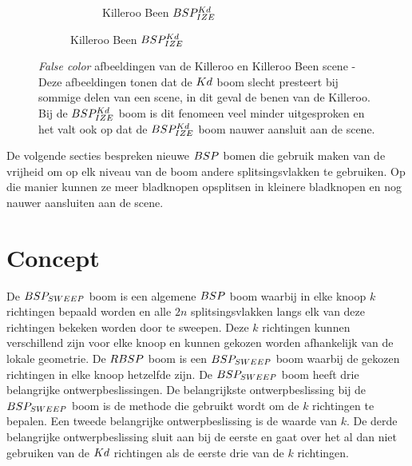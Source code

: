 \begin{figure}
\begin{subfigure}{0.5\textwidth}
\begin{subfigure}{\textwidth}
            \caption{Killeroo Been $BSP^{Kd}_{IZE}$}
            \label{fig:killeroo-been-bspize-heatmap}    
        \end{subfigure}
    \end{subfigure}
    \caption[\textit{False color} afbeeldingen van de Killeroo en Killeroo Been scene]{\textit{False color} afbeeldingen van de Killeroo en Killeroo Been scene - \small Deze afbeeldingen tonen dat de $Kd$ boom slecht presteert bij sommige delen van een scene, in dit geval de benen van de Killeroo. Bij de $BSP^{Kd}_{IZE}$ boom is dit fenomeen veel minder uitgesproken en het valt ook op dat de $BSP^{Kd}_{IZE}$ boom nauwer aansluit aan de scene.}
    \label{fig:killeroo-heatmaps}
\end{figure}

De volgende secties bespreken nieuwe $BSP$ bomen die gebruik maken van de vrijheid om op elk niveau van de boom andere splitsingsvlakken te gebruiken. Op die manier kunnen ze meer bladknopen opsplitsen in kleinere bladknopen en nog nauwer aansluiten aan de scene.\\



\section{Concept}\label{sct:concept}
    De $BSP_{SWEEP}$ boom is een algemene $BSP$ boom waarbij in elke knoop $k$ richtingen bepaald worden en alle $2n$ splitsingsvlakken langs elk van deze richtingen bekeken worden door te sweepen.
    Deze $k$ richtingen kunnen verschillend zijn voor elke knoop en kunnen gekozen worden afhankelijk van de lokale geometrie.
    De $RBSP$ boom is een $BSP_{SWEEP}$ boom waarbij de gekozen richtingen in elke knoop hetzelfde zijn.
    De $BSP_{SWEEP}$ boom heeft drie belangrijke ontwerpbeslissingen.
    De belangrijkste ontwerpbeslissing bij de $BSP_{SWEEP}$ boom is de methode die gebruikt wordt om de $k$ richtingen te bepalen.
    Een tweede belangrijke ontwerpbeslissing is de waarde van $k$.
    De derde belangrijke ontwerpbeslissing sluit aan bij de eerste en gaat over het al dan niet gebruiken van de $Kd$ richtingen als de eerste drie van de $k$ richtingen.
    \\


